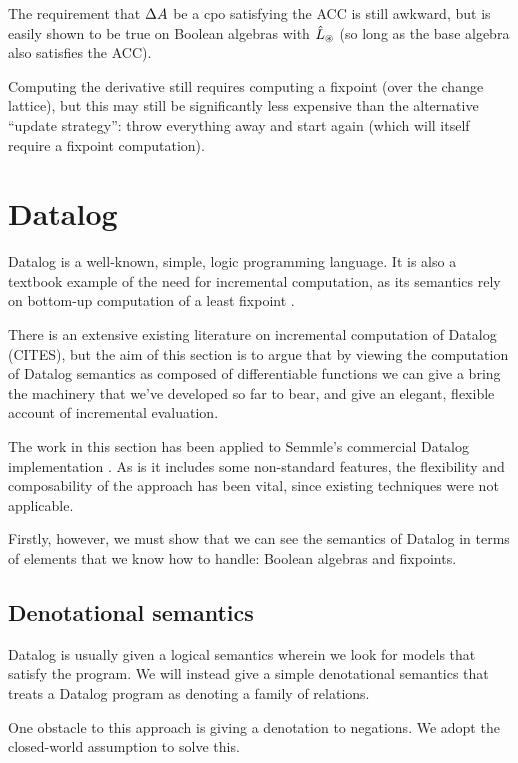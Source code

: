 The requirement that $\Delta A$ be a cpo satisfying the ACC is still awkward, but is easily
shown to be true on Boolean algebras with $\hat{L}_\circledast$ (so long as the base
algebra also satisfies the ACC).

Computing the derivative still requires computing a fixpoint (over the change
lattice), but this may still be significantly less expensive than the
alternative ``update strategy'': throw everything away and start
again (which will itself require a fixpoint computation).

\section{Datalog}
\label{sec:datalog}

Datalog is a well-known, simple, logic programming language. It is also a textbook
example of the need for incremental computation, as its semantics rely on
bottom-up computation of a least fixpoint \autocite[See][part D]{abiteboul1995foundations}.

There is an extensive existing literature on incremental computation of Datalog
(CITES), but the aim of this section is to argue that by viewing the computation
of Datalog semantics as composed of differentiable functions we can give a
bring the machinery that we've developed so far to bear, and give an elegant,
flexible account of incremental evaluation.

The work in this section has been applied to Semmle's commercial Datalog
implementation \autocites{semmleWebsite}{avgustinov2016ql}{sereni2008adding}{schafer2010type}.
As is it includes some non-standard features, the flexibility and composability
of the approach has been vital, since existing techniques were not applicable.

Firstly, however, we must show that we can see the semantics of Datalog in terms
of elements that we know how to handle: Boolean algebras and fixpoints.

\subsection{Denotational semantics}

Datalog is usually given a logical semantics wherein we look for models that
satisfy the program. We will instead give a simple denotational semantics that treats a Datalog
program as denoting a family of relations.

One obstacle to this approach is giving a denotation to negations. We adopt the
closed-world assumption to solve this.

